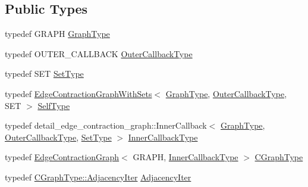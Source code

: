 \subsection*{Public Types}
\begin{DoxyCompactItemize}
\item 
typedef G\+R\+A\+P\+H \hyperlink{structnifty_1_1graph_1_1EdgeContractionGraphWithSetsHelper_a7f5226bf25f277d906a526db55556cdf}{Graph\+Type}
\item 
typedef O\+U\+T\+E\+R\+\_\+\+C\+A\+L\+L\+B\+A\+C\+K \hyperlink{structnifty_1_1graph_1_1EdgeContractionGraphWithSetsHelper_a3e0b97cbc8de91c57e3dc83860edda69}{Outer\+Callback\+Type}
\item 
typedef S\+E\+T \hyperlink{structnifty_1_1graph_1_1EdgeContractionGraphWithSetsHelper_acc1b924a2b02648491b614c8d69ca9fb}{Set\+Type}
\item 
typedef \hyperlink{classnifty_1_1graph_1_1EdgeContractionGraphWithSets}{Edge\+Contraction\+Graph\+With\+Sets}$<$ \hyperlink{structnifty_1_1graph_1_1EdgeContractionGraphWithSetsHelper_a7f5226bf25f277d906a526db55556cdf}{Graph\+Type}, \hyperlink{structnifty_1_1graph_1_1EdgeContractionGraphWithSetsHelper_a3e0b97cbc8de91c57e3dc83860edda69}{Outer\+Callback\+Type}, S\+E\+T $>$ \hyperlink{structnifty_1_1graph_1_1EdgeContractionGraphWithSetsHelper_a7b0578f3509ed396dd72b029e4e8b105}{Self\+Type}
\item 
typedef detail\+\_\+edge\+\_\+contraction\+\_\+graph\+::\+Inner\+Callback$<$ \hyperlink{structnifty_1_1graph_1_1EdgeContractionGraphWithSetsHelper_a7f5226bf25f277d906a526db55556cdf}{Graph\+Type}, \hyperlink{structnifty_1_1graph_1_1EdgeContractionGraphWithSetsHelper_a3e0b97cbc8de91c57e3dc83860edda69}{Outer\+Callback\+Type}, \hyperlink{structnifty_1_1graph_1_1EdgeContractionGraphWithSetsHelper_acc1b924a2b02648491b614c8d69ca9fb}{Set\+Type} $>$ \hyperlink{structnifty_1_1graph_1_1EdgeContractionGraphWithSetsHelper_a04b455cc805d998b02d24ee3a11523ec}{Inner\+Callback\+Type}
\item 
typedef \hyperlink{classnifty_1_1graph_1_1EdgeContractionGraph}{Edge\+Contraction\+Graph}$<$ G\+R\+A\+P\+H, \hyperlink{structnifty_1_1graph_1_1EdgeContractionGraphWithSetsHelper_a04b455cc805d998b02d24ee3a11523ec}{Inner\+Callback\+Type} $>$ \hyperlink{structnifty_1_1graph_1_1EdgeContractionGraphWithSetsHelper_add695ccd6756ec7e79ce2b4e6fceb5fc}{C\+Graph\+Type}
\item 
typedef \hyperlink{classnifty_1_1graph_1_1EdgeContractionGraph_a447212f5ced0c4ef4d304e8b89f4f200}{C\+Graph\+Type\+::\+Adjacency\+Iter} \hyperlink{structnifty_1_1graph_1_1EdgeContractionGraphWithSetsHelper_a9d9969291ab3cf558c7ad2f00a2c189d}{Adjacency\+Iter}

\end{DoxyCompactItemize}
